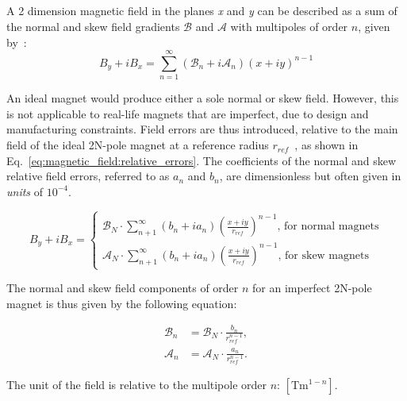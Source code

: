 \subsection{}

A 2 dimension magnetic field in the planes \textit{x} and \textit{y} can be described as a sum of
the normal and skew field gradients $\mathcal{B}$ and $\mathcal{A}$ with multipoles of order $n$,
given by~\cite{wolf_engineering_2001}:
\begin{equation}
    B_y + iB_x = \sum_{n=1}^\infty \left(\mathcal{B}_n + i\mathcal{A}_n \right)  (x+iy)^{n-1}
\end{equation}

An ideal magnet would produce either a sole normal or skew field. However, this is not applicable 
to real-life magnets that are imperfect, due to design and manufacturing constraints.
Field errors are thus introduced, relative to the main field of the ideal 2N-pole magnet at a
reference radius $r_{ref}$~\cite{dilly_corrections_2022}, as shown in 
Eq.~\eqref{eq:magnetic_field:relative_errors}. The coefficients of the normal and skew relative 
field errors, referred to as $a_n$ and $b_n$, are dimensionless but often given in \textit{units}
of $10^{-4}$.

\begin{equation}
    B_y + iB_x = 
        \begin{cases}
            \mathcal{B}_N \cdot \sum_{n+1}^\infty (b_n + ia_n) \left(\frac{x+iy}{r_{ref}}\right)^{n-1}\text{, for normal magnets}\\
            \mathcal{A}_N \cdot \sum_{n+1}^\infty (b_n + ia_n) \left(\frac{x+iy}{r_{ref}}\right)^{n-1}\text{, for skew magnets}
        \end{cases}
    \label{eq:magnetic_field:relative_errors}
\end{equation}


The normal and skew field components of order $n$ for an imperfect 2N-pole magnet is thus given by
the following equation:

\begin{equation}
    \begin{aligned}
        \mathcal{B}_n &= \mathcal{B}_N \cdot \frac{b_n}{r_{ref}^{n-1}}, \\
        \mathcal{A}_n &= \mathcal{A}_N \cdot \frac{a_n}{r_{ref}^{n-1}}.
    \end{aligned}
\end{equation}

The unit of the field is relative to the multipole order $n$: $[\text{Tm}^{1-n}]$.


